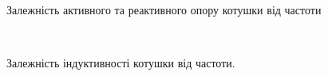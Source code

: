 \begin{figure}[h]
    \begin{minipage}[h]{0.47\linewidth}
         \\
    \end{minipage}
    \hfill
    \begin{minipage}[h]{0.47\linewidth}
        \\
    \end{minipage}    
    \caption{Залежність активного та реактивного опору котушки від частоти}
    \label{fig:part223}
\end{figure}

\begin{figure}[h]
     \\
    \caption{Залежність індуктивності котушки від частоти.}
    \label{fig:part3L}
\end{figure}

